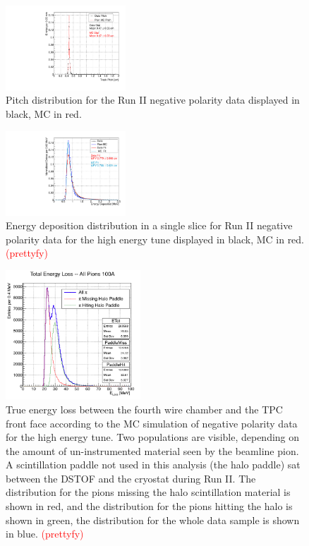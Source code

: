 \documentclass[aps,prl,twocolumn,showpacs,superscriptaddress,groupedaddress]{revtex4}  %
\begin{document}
\begin{figure}
\includegraphics[width =0.4\textwidth ]{PitchPi}
\caption{\label{fig:pitch}  Pitch distribution for the Run II negative polarity data displayed in black, MC in red.}
\end{figure}
\begin{figure}
\includegraphics[width =0.4\textwidth ]{dE.pdf}
\caption{\label{fig:enDep}  Energy deposition distribution in a single slice for Run II negative polarity data for the high energy tune displayed in black, MC in red. \textcolor{red}{(prettyfy)}}
\end{figure}

\begin{figure}
\centering
\includegraphics[width=0.45\textwidth]{E_loss100A.png}
\caption{\label{fig:ELoss100A}  True energy loss between the fourth wire chamber and the TPC front face according to the MC simulation of negative polarity data for the high energy tune. Two populations are visible, depending on the amount of un-instrumented material seen by the beamline pion. A scintillation paddle not used in this analysis (the halo paddle) sat between the DSTOF and the cryostat during Run II. The distribution for the pions missing the halo scintillation material is shown in red, and the distribution for the pions hitting the halo is shown in green, the distribution for the whole data sample is shown in blue. \textcolor{red}{(prettyfy)} }
\end{figure}
\end{document}
